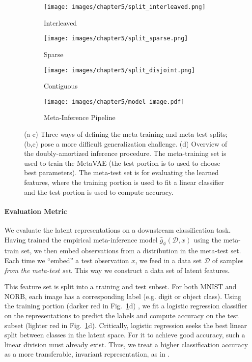  \begin{figure}
    \centering
    \begin{subfigure}[b]{0.21\linewidth}
        \texttt{[image: images/chapter5/split\_interleaved.png]}
        \caption{Interleaved}
    \end{subfigure}
    \hspace{1em}
    \begin{subfigure}[b]{0.21\linewidth}
        \texttt{[image: images/chapter5/split\_sparse.png]}
        \caption{Sparse}
    \end{subfigure}
    \hspace{1em}
    \begin{subfigure}[b]{0.21\linewidth}
        \texttt{[image: images/chapter5/split\_disjoint.png]}
        \caption{Contiguous}
    \end{subfigure}
    \begin{subfigure}[b]{0.8\linewidth}
        \texttt{[image: images/chapter5/model\_image.pdf]}
        \caption{Meta-Inference Pipeline}
    \end{subfigure}
    \caption{(a-c) Three ways of defining the meta-training and meta-test splits; (b,c) pose a more difficult generalization challenge. (d) Overview of the doubly-amortized inference procedure. The meta-training set is used to train the MetaVAE (the test portion is to used to choose best parameters). The meta-test set is for evaluating the learned features, where the training portion is used to fit a linear classifier and the test portion is used to compute accuracy.}
    \label{fig:splits}
\end{figure}
 

\paragraph{Evaluation Metric} We evaluate the latent representations on a downstream classification task. Having trained the empirical meta-inference model $\hat{g}_\phi(\mathcal{D}, x)$ using the meta-train set, we then embed observations from a distribution in the meta-test set. Each time we ``embed'' a test observation $x$, we feed in a data set $\mathcal{D}$ of samples \emph{from the meta-test set}. This way we construct a data set of latent features.

This feature set is split into a training and test subset. For both MNIST and NORB, each image has a corresponding label (e.g. digit or object class). 
Using the training portion (darker red in Fig.~\ref{fig:splits}d) , we fit a logistic regression classifier on the representations to predict the labels and compute accuracy on the test subset (lighter red in Fig.~\ref{fig:splits}d). 
Critically, logistic regression seeks the best linear split between classes in the latent space. For it to achieve good accuracy, such a linear division must already exist.
Thus, we treat a higher classification accuracy as a more transferable, invariant representation, as in \cite{berthelot2018understanding}.

